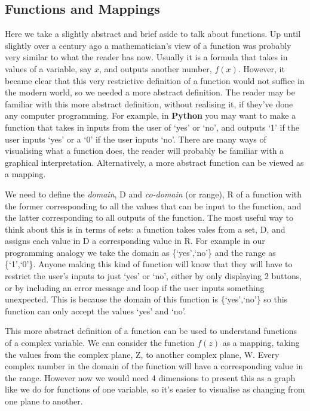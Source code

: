 \subsection{Functions and Mappings}
Here we take a slightly abstract and brief aside to talk about functions.
 Up until slightly over a century ago a mathematician's view of a function was probably very similar to what the reader has now.
 Usually it is a formula that takes in values of a variable, say $x$, and outputs another number, $f(x)$.
 However, it became clear that this very restrictive definition of a function would not suffice in the modern world, so we needed a more abstract definition.
 The reader may be familiar with this more abstract definition, without realising it, if they've done any computer programming.
 For example, in \textbf{Python} you may want to make a function that takes in inputs from the user of `yes' or `no', and outputs `1' if the user inputs `yes' or a `0' if the user inputs `no'.
 There are many ways of visualising what a function does, the reader will probably be familiar with a graphical interpretation.
 Alternatively, a more abstract function can be viewed as a mapping. 
\par     
We need to define the \emph{domain}, D and \emph{co-domain} (or range), R of a function with the former corresponding to all the values that can be input to the function, and the latter corresponding to all outputs of the function.
 The most useful way to think about this is in terms of sets: a function takes vales from a set, D, and assigns each value in D a corresponding value in R.
 For example in our programming analogy we take the domain as \{`yes',`no'\} and the range as \{`1',`0'\}. 
 Anyone making this kind of function will know that they will have to restrict the user's inputs to just `yes' or `no', either by only displaying 2 buttons, or by including an error message and loop if the user inputs something unexpected.
 This is because the domain of this function is \{`yes',`no'\} so this function can only accept the values `yes' and `no'.
\par 
This more abstract definition of a function can be used to understand functions of a complex variable.
 We can consider the function $f(z)$ as a mapping, taking the values from the complex plane, Z, to another complex plane, W.
 Every complex number in the domain of the function will have a corresponding value in the range. However now we would need 4 dimensions to present this as a graph like we do for functions of one variable, so it's easier to visualise as changing from one plane to another.
